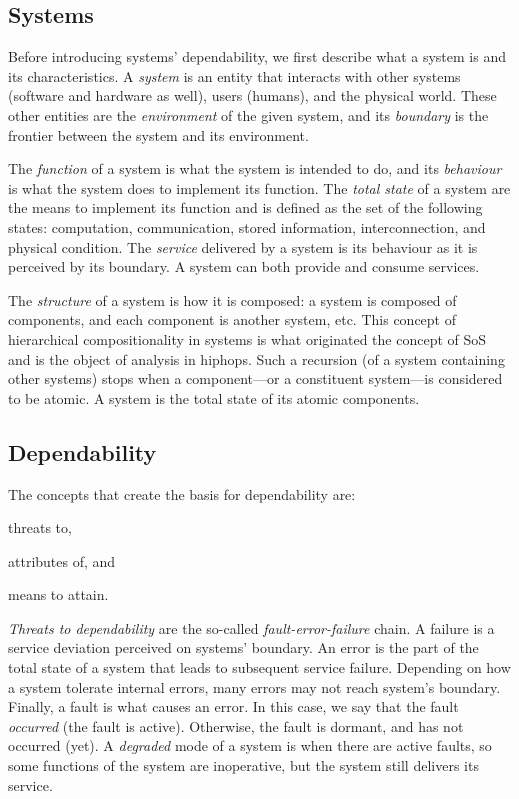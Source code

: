 \subsection{Systems}

Before introducing systems' dependability, we first describe what a system is and its characteristics.
A \emph{system} is an entity that interacts with other systems (software and hardware as well), users (humans), and the physical world.
These other entities are the \emph{environment} of the given system, and its \emph{boundary} is the frontier between the system and its environment.

The \emph{function} of a system is what the system is intended to do, and its \emph{behaviour} is what the system does to implement its function. 
The \emph{total state} of a system are the means to implement its function and is defined as the set of the following states: computation, communication, stored information, interconnection, and physical condition.
The \emph{service} delivered by a system is its behaviour as it is perceived by its boundary.
A system can both provide and consume services.

The \emph{structure} of a system is how it is composed: a system is composed of components, and each component is another system, etc.
This concept of hierarchical compositionality in systems is what originated the concept of \ac{SoS} and is the object of analysis in \ac{hiphops}.
Such a recursion (of a system containing other systems) stops when a component---or a constituent system---is considered to be atomic.
A system is the total state of its atomic components.

\subsection{Dependability}

The concepts that create the basis for dependability are:
\begin{alineasinline}
  \item threats to,
  \item attributes of, and
  \item means to attain.
\end{alineasinline}

\emph{Threats to dependability} are the so-called \emph{fault-error-failure} chain.
A failure is a service deviation perceived on systems' boundary.
An error is the part of the total state of a system that leads to subsequent service failure.
Depending on how a system tolerate internal errors, many errors may not reach system's boundary.
Finally, a fault is what causes an error.
In this case, we say that the fault \emph{occurred} (the fault is active).
Otherwise, the fault is dormant, and has not occurred (yet).
A \emph{degraded} mode of a system is when there are active faults, so some functions of the system are inoperative, but the system still delivers its service.

